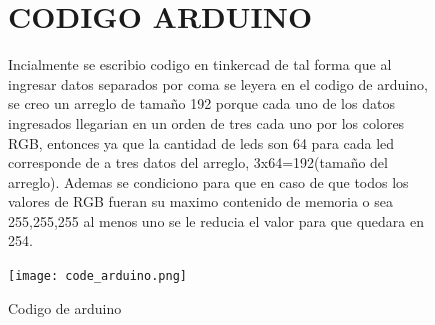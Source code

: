 \documentclass{article}
\begin{document}
\begin{figure}
\section{CODIGO ARDUINO}
Incialmente se escribio codigo en tinkercad de tal forma que al ingresar datos separados por coma se leyera en el codigo de arduino, se creo un arreglo de tamaño 192 porque cada uno de los datos ingresados llegarian en un orden de tres cada uno por los colores RGB, entonces ya que la cantidad de leds son 64 para cada led corresponde de a tres datos del arreglo, 3x64=192(tamaño del arreglo).
Ademas se condiciono para que en caso de que todos los valores de RGB fueran su maximo contenido de memoria o sea 255,255,255 al menos uno se le reducia el valor para que quedara en 254.

    \texttt{[image: code\_arduino.png]}
    \centering
    \caption{Codigo de arduino}
    \label{fig:code_arduino}
    \end{figure}
 
\end{document}
